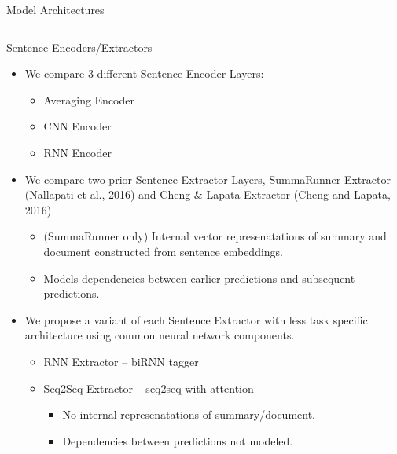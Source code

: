\begin{frame}{Model Architectures}
\begin{columns}
\begin{column}{0.58\textwidth}
{}
\end{column}
\end{columns}
\end{frame}


\begin{frame}{Sentence Encoders/Extractors}

    \begin{itemize}
        \item We compare 3 different Sentence Encoder Layers:
            \begin{itemize}
                \item Averaging Encoder
                \item CNN Encoder 
                \item RNN Encoder
                \end{itemize}
            \vspace{5pt}
        \item We compare two prior Sentence Extractor Layers,
                SummaRunner Extractor {\tiny (Nallapati et al., 2016)}
                and  Cheng \& Lapata Extractor {\tiny(Cheng and Lapata, 2016)}
                \begin{itemize}
                    \item (SummaRunner only) Internal vector represenatations of summary and document constructed from sentence embeddings.
                    \item Models dependencies between earlier predictions
                        and subsequent predictions.
                \end{itemize}
            \vspace{5pt}
       \item We propose a variant of each Sentence Extractor with less task 
           specific architecture using common neural network components.
            \begin{itemize}
                \item RNN Extractor -- biRNN tagger
                \item Seq2Seq Extractor -- seq2seq with attention
                \begin{itemize}
                    \item No internal represenatations of summary/document.
                    \item Dependencies between predictions not modeled.
            \end{itemize}
            \end{itemize}
    \end{itemize}


\end{frame}
